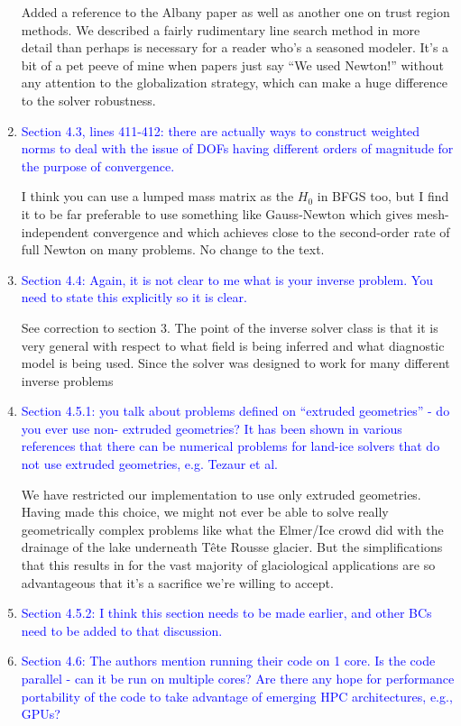 \documentclass{article}
\theoremstyle{definition}
\theoremstyle{plain}
\begin{document}
\begin{enumerate}
Added a reference to the Albany paper as well as another one on trust region methods.
We described a fairly rudimentary line search method in more detail than perhaps is necessary for a reader who's a seasoned modeler.
It's a bit of a pet peeve of mine when papers just say ``We used Newton!'' without any attention to the globalization strategy, which can make a huge difference to the solver robustness.
\item \textcolor{blue}{Section 4.3, lines 411-412: there are actually ways to construct weighted norms to deal with the issue
of DOFs having different orders of magnitude for the purpose of convergence.}

I think you can use a lumped mass matrix as the $H_0$ in BFGS too, but I find it to be far preferable to use something like Gauss-Newton which gives mesh-independent convergence and which achieves close to the second-order rate of full Newton on many problems.
No change to the text.
\item \textcolor{blue}{Section 4.4: Again, it is not clear to me what is your inverse problem. You need to state this explicitly
so it is clear.}

See correction to section 3.
The point of the inverse solver class is that it is very general with respect to what field is being inferred and what diagnostic model is being used.
Since the solver was designed to work for many different inverse problems
\item \textcolor{blue}{Section 4.5.1: you talk about problems defined on ``extruded geometries'' - do you ever use non-
extruded geometries? It has been shown in various references that there can be numerical problems
for land-ice solvers that do not use extruded geometries, e.g. Tezaur et al.}

We have restricted our implementation to use only extruded geometries.
Having made this choice, we might not ever be able to solve really geometrically complex problems like what the Elmer/Ice crowd did with the drainage of the lake underneath T\^ete Rousse glacier.
But the simplifications that this results in for the vast majority of glaciological applications are so advantageous that it's a sacrifice we're willing to accept.
\item \textcolor{blue}{Section 4.5.2: I think this section needs to be made earlier, and other BCs need to be added to that
discussion.}
\item \textcolor{blue}{Section 4.6: The authors mention running their code on 1 core. Is the code parallel - can it be run
on multiple cores? Are there any hope for performance portability of the code to take advantage of
emerging HPC architectures, e.g., GPUs?}


\end{enumerate}
\end{document}
